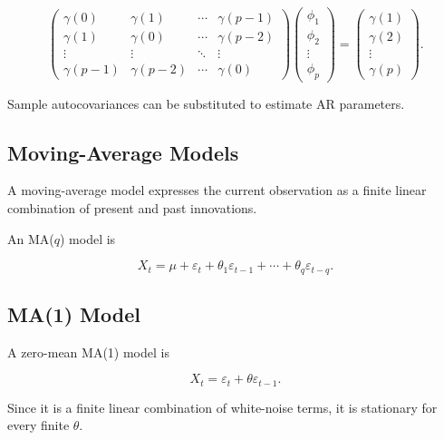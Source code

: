 \[
\boxed{
\begin{pmatrix}
\gamma(0)
&
\gamma(1)
&
\cdots
&
\gamma(p-1)
\\
\gamma(1)
&
\gamma(0)
&
\cdots
&
\gamma(p-2)
\\
\vdots
&
\vdots
&
\ddots
&
\vdots
\\
\gamma(p-1)
&
\gamma(p-2)
&
\cdots
&
\gamma(0)
\end{pmatrix}
\begin{pmatrix}
\phi_1\\
\phi_2\\
\vdots\\
\phi_p
\end{pmatrix}
=
\begin{pmatrix}
\gamma(1)\\
\gamma(2)\\
\vdots\\
\gamma(p)
\end{pmatrix}.
}
\]

Sample autocovariances can be substituted to estimate AR parameters.

\subsection{Moving-Average Models}
\label{subsec:moving-average-models}

A moving-average model expresses the current observation as a finite
linear combination of present and past innovations.

An MA(\(q\)) model is

\[
\boxed{
X_t
=
\mu
+
\varepsilon_t
+
\theta_1\varepsilon_{t-1}
+
\cdots
+
\theta_q\varepsilon_{t-q}.
}
\]

\subsection{MA(1) Model}
\label{subsec:ma1-model}

A zero-mean MA(1) model is

\[
\boxed{
X_t
=
\varepsilon_t
+
\theta\varepsilon_{t-1}.
}
\]

Since it is a finite linear combination of white-noise terms, it is
stationary for every finite \(\theta\).

